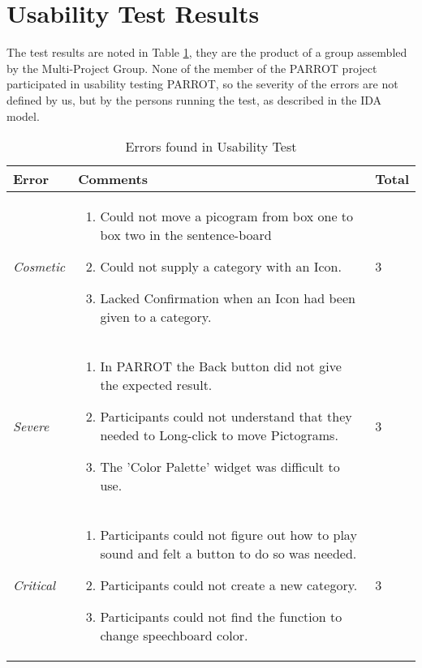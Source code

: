 \section{Usability Test Results}
\label{sec:UseTestRes}
The test results are noted in Table \ref{tab:ErrorsFoundInUsabilityTest}, they are the product of a group assembled by the Multi-Project Group.
None of the member of the PARROT project participated in usability testing PARROT, so the severity of the errors are not defined by us, but by the persons running the test, as described in the IDA model.
\begin{table}
	\centering
		\begin{tabular}{| p{2cm} | p{5cm} | p{2cm} |}
		\hline
			\textbf{Error} & \textbf{Comments} & Total\\
		\hline
			\textit{Cosmetic} & \begin{enumerate}
														\item Could not move a picogram from box one to box two in the sentence-board
														\item Could not supply a category with an Icon.
														\item Lacked Confirmation when an Icon had been given to a category.
													\end{enumerate} & 3 \\ 
		\hline
			\textit{Severe} & \begin{enumerate}
													\item In PARROT the Back button did not give the expected result.
													\item Participants could not understand that they needed to Long-click to move Pictograms.
													\item The 'Color Palette' widget was difficult to use.
												\end{enumerate} & 3 \\
		\hline
			\textit{Critical} & \begin{enumerate}
														\item Participants could not figure out how to play sound and felt a button to do so was needed.
														\item Participants could not create a new category.
														\item Participants could not find the function to change speechboard color.
													\end{enumerate} & 3 \\
		\hline
		\end{tabular}
	\caption{Errors found in Usability Test}
	\label{tab:ErrorsFoundInUsabilityTest}
\end{table}